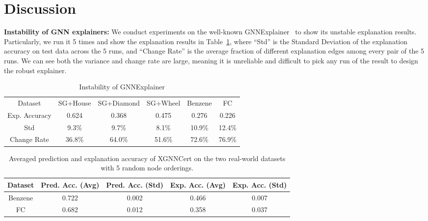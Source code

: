 \section{Discussion}
\label{app:discussion}

{\bf Instability of GNN explainers:}
We conduct experiments on the well-known GNNExplainer~\citep{GNNEx19} to show its unstable explanation results. Particularly, we run it 5 times and show the explanation results in Table~\ref{tab:instable}, where “Std” is the Standard Deviation of the explanation accuracy on test data across the 5 runs, and “Change Rate” is the average fraction of different explanation edges among every pair of the 5 runs. 
We can see both the variance and change rate are  large, meaning it is unreliable and difficult to pick any run of the result to design the robust explainer. 

\begin{table}[!h]
    \centering
    \begin{tabular}{c|c|c|c|c|c}
    \toprule
    Dataset&SG+House&SG+Diamond&SG+Wheel&Benzene&FC\\
    
    \Xhline{0.8pt} 
    Exp. Accuracy&0.624&0.368&0.475&0.276&0.226 \\
    \cline{1-6}
    Std& 9.3\%&9.7\%&8.1\%&10.9\%&12.4\%\\
    \cline{1-6}
    Change Rate&36.8\%&64.0\%&51.6\%&72.6\%&76.9\%\\
    \bottomrule
    \end{tabular}
    \caption{Instability of GNNExplainer}
    \label{tab:instable}
\end{table}


\begin{table}[!ht]
    \centering
    \renewcommand{\arraystretch}{1.2}
    \begin{tabular}{c|c|c|c|c}
        \hline
        \textbf{Dataset} & \textbf{Pred. Acc. (Avg)} & \textbf{Pred. Acc. (Std)} & \textbf{Exp. Acc. (Avg)} & \textbf{Exp. Acc. (Std)} \\ \hline
        Benzene & 0.722 & 0.002 & 0.466 & 0.007 \\ \hline
        FC      & 0.682 & 0.012 & 0.358 & 0.037 \\ \hline
    \end{tabular}
    \caption{Averaged prediction and explanation accuracy of XGNNCert on the two real-world datasets with 5 random node orderings.}
    \label{tab:gnncert_runs}
\end{table}


